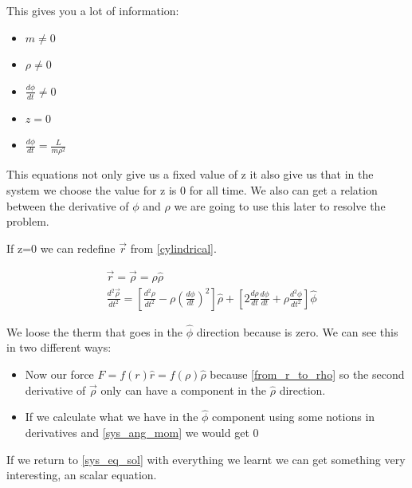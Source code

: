 This gives you a lot of information:

\begin{itemize}
    \item $m \neq 0$
    \item $\rho \neq 0$
    \item $\frac{d\phi}{dt} \neq 0$
    \item $z = 0$
    \item $\frac{d\phi}{dt} = \frac{L}{m\rho^2}$
    
\end{itemize}

This equations not only give us a fixed value of z it also give us that in the system we choose the value for z is 0 for all time. We also can get a relation between the derivative of $\phi$ and $\rho$ we are going to use this later to resolve the problem. 

If z=0 we can redefine $\vec{r}$ from \ref{cylindrical}.

\begin{equation}
    \label{from_r_to_rho}
    \begin{split}
        &\vec{r} = \vec{\rho} = \rho\hat{\rho} \\
        &\frac{d^2\vec{\rho}}{dt^2} = \left[ \frac{d^2\rho}{dt^2} -\rho\left(\frac{d\phi}{dt}\right)^2 \right]\hat{\rho} + \left[2\frac{d\rho}{dt}\frac{d\phi}{dt} +\rho\frac{d^2\phi}{dt^2} \right]\hat{\phi}
    \end{split}
\end{equation}

We loose the therm that goes in the $\hat{\phi}$ direction because is zero. We can see this in two different ways:

\begin{itemize}
    \item Now our force $F = f(r)\hat{r} = f(\rho)\hat{\rho}$ because \ref{from_r_to_rho} so the second derivative of $\Vec{\rho}$ only can have a component in the $\hat{\rho}$ direction.
    \item If we calculate what we have in the $\hat{\phi}$ component using some notions in derivatives and \ref{sys_ang_mom} we would get 0  
\end{itemize}



If we return to \ref{sys_eq_sol} with everything we learnt we can get something very interesting, an scalar equation.

